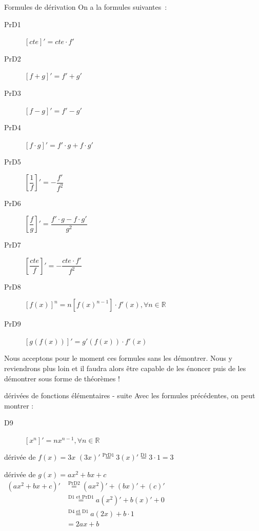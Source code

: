 \documentclass[a4paper,12pt]{article}
\begin{document}
\begin{formule}
Formules de dérivation
\tcblower
On a la formules suivantes~:
\begin{description}
\item [PrD1] $[cte]' = cte \cdot f'$
\item [PrD2] $[f + g]' = f' + g'$  
\item [PrD3] $[f - g]' = f' - g'$
\item [PrD4] $[f \cdot g]' = f' \cdot g + f \cdot g'$
\item [PrD5] $\left[\dfrac{1}{f}\right]' = -\dfrac{f'}{f^2}$
\item [PrD6] $\left[\dfrac{f}{g}\right]' = \dfrac{f' \cdot g - f \cdot g'}{g^2}$
\item [PrD7] $\left[\dfrac{cte}{f}\right]' = -\dfrac{cte \cdot f'}{f^2}$
\item [PrD8] $[f(x)]^n = n[f(x)^{n-1}] \cdot f'(x), \forall n \in \mathbb{R}$
\item [PrD9] $[g(f(x))]' = g'(f(x)) \cdot f'(x)$
\end{description}
\end{formule}

\begin{remarque}
	\tcblower
Nous acceptons pour le moment ces formules sans les démontrer. Nous y reviendrons plus loin et il faudra alors être capable de les énoncer puis de les démontrer sous forme de théorèmes !
\end{remarque}

\begin{formule}
dérivées de fonctions élémentaires - suite
\tcblower
Avec les formules précédentes, on peut montrer :
\begin{description}
\item[D9] $[x^n]' = nx^{n-1}, \forall n \in \mathbb{R}$
\end{description}
\end{formule}

\begin{exemple}
	dérivée de $f(x)=3x$
	\tcblower
$(3x)' \stackrel{\text{PrD1}}{=} 3(x)' \stackrel{\text{D1}}{=} 3 \cdot 1 = 3$
\end{exemple}

\begin{exemple}
	dérivée de $g(x)=ax^2+bx+c$
	\tcblower
$\begin{aligned}
	(ax^2 + bx + c)' &\stackrel{\text{PrD2}}{=} (ax^2)' + (bx)' + (c)'\\ &\stackrel{\text{D1 et PrD1}}{=} a(x^2)' + b(x)' + 0\\
			 &\stackrel{\text{D4 et D1}}{=} a(2x) + b \cdot 1\\
			 &= 2ax + b
\end{aligned}$
\end{exemple}
\end{document}
